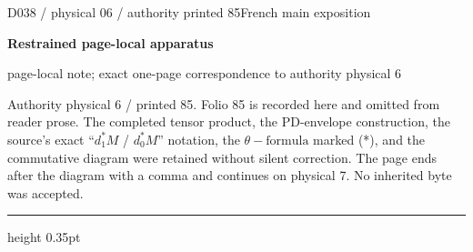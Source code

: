 \documentclass[9pt]{article}
\newcommand{\CanonText}[1]{\par{\fontsize{8.0}{9.35}\selectfont\RaggedRight #1\par}\vspace{2.2pt}}
\newcommand{\LayerTitle}{Restrained page-local apparatus}
\begin{document}
\noindent\begin{minipage}[t][\dimexpr\textheight-5pt\relax][t]{\textwidth}
{\sffamily\fontsize{7.3}{8.2}\selectfont\color{Quiet} D038 / physical 06 / authority printed 85\hfill French main exposition}
\par{}\vspace{4.5pt}
{\sffamily\fontsize{10.4}{11.6}\selectfont\bfseries\color{Accent} \LayerTitle}
\par{\sffamily\fontsize{6.7}{7.7}\selectfont\color{Quiet} page-local note; exact one-page correspondence to authority physical 6}
\vspace{5pt}
\CanonText{Authority physical 6 / printed 85. Folio 85 is recorded here and omitted from reader prose. The completed tensor product, the PD-envelope construction, the source’s exact “\(d_{1}^{*}M\) / \(d_{0}^{*}M\)” notation, the \(\theta{}-\text{formula}\) marked (*), and the commutative diagram were retained without silent correction. The page ends after the diagram with a comma and continues on physical 7. No inherited byte was accepted.}
\vfill
{\color{Accent}\hrule height 0.35pt}\vspace{3pt}
\end{minipage}
\newpage
\end{document}
